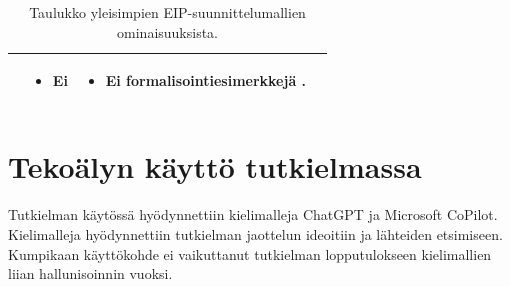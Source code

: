 \begin{table}[h]
\begin{tabular}{|p{}|p{}|p{}|p{}|}
\begin{itemize}
        \end{itemize}
      &
        \begin{itemize}
            \item Ei
        \end{itemize}
      &
        \begin{itemize}
           \item Ei formalisointiesimerkkejä \citep{Ritter2021}.
        \end{itemize}
      \\ \hline
    \end{tabular}
   \caption{Taulukko yleisimpien EIP-suunnittelumallien ominaisuuksista.}
   \label{table:eip2}
\end{table}



\chapter*{Tekoälyn käyttö tutkielmassa}
Tutkielman käytössä hyödynnettiin kielimalleja ChatGPT ja Microsoft CoPilot. Kielimalleja hyödynnettiin tutkielman jaottelun ideoitiin ja lähteiden etsimiseen. Kumpikaan käyttökohde ei vaikuttanut tutkielman lopputulokseen kielimallien liian hallunisoinnin vuoksi.

